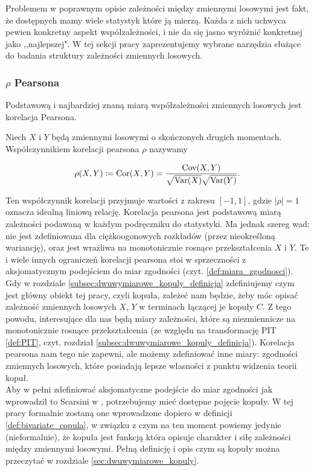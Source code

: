 Problemem w poprawnym opisie zależności między zmiennymi losowymi jest fakt, że dostępnych mamy wiele statystyk które ją mierzą. Każda z nich uchwyca pewien konkretny aspekt współzależności, i nie da się jasno wyróżnić konkretnej jako ,,najlepszej". W tej sekcji pracy zaprezentujemy wybrane narzędzia służące do badania struktury zależności zmiennych losowych.

\subsubsection{$\rho$ Pearsona}
Podstawową i najbardziej znaną miarą współzależności zmiennych losowych jest korelacja Pearsona.

\begin{df}
	Niech $X$ i $Y$ będą zmiennymi losowymi o skończonych drugich momentach. Współczynnikiem korelacji pearsona $\rho$ nazywamy
	
	$$ \rho(X, Y) \coloneqq \text{Cor}(X,Y) = \frac{\text{Cov}(X,Y)}{\sqrt{\text{Var}(X)}\sqrt{\text{Var}(Y)}}.$$
\end{df}

Ten współczynnik korelacji przyjmuje wartości z zakresu $[-1, 1]$, gdzie $\vert\rho\vert=1$ oznacza idealną liniową relację. Korelacja pearsona jest podstawową miarą zależności podawaną w każdym podręczniku do statystyki. Ma jednak szereg wad: nie jest zdefiniowana dla ciężkoogonowych rozkładów (przez nieokreśloną wariancję), oraz jest wrażliwa na monotonicznie rosnące przekształcenia $X$ i $Y$. Te i wiele innych ograniczeń korelacji pearsona stoi w sprzeczności z aksjomatycznym podejściem do miar zgodności (czyt. \ref{def:miara_zgodnosci}). \\
Gdy w rozdziale \ref{subsec:dwuwymiarowe_kopuly_definicja} zdefiniujemy czym jest główny obiekt tej pracy, czyli kopuła, zależeć nam będzie, żeby móc opisać zależność zmiennych losowych $X$, $Y$ w terminach łączącej je kopuły $C$. Z tego powodu, interesujące dla nas będą miary zależności, które są niezmiennicze na monotonicznie rosnące przekształcenia (ze względu na transformację PIT \ref{def:PIT}, czyt. rozdział \ref{subsec:dwuwymiarowe_kopuly_definicja}). Korelacja pearsona nam tego nie zapewni, ale możemy zdefiniować inne miary: zgodności zmiennych losowych, które posiadają lepsze własności z punktu widzenia teorii kopuł.\\

Aby w pełni zdefiniować aksjomatyczne podejście do miar zgodności jak wprowadził to Scarsini w \cite{Scarsini1984}, potrzebujemy mieć dostępne pojęcie kopuły. W tej pracy formalnie zostaną one wprowadzone dopiero w definicji \ref{def:bivariate_copula}, w związku z czym na ten moment powiemy jedynie (nieformalnie), że kopuła jest funkcją która opisuje charakter i siłę zależności między zmiennymi losowymi. Pełną definicję i opis czym są kopuły można przeczytać w rozdziale \ref{sec:dwuwymiarowe_kopuly}.

